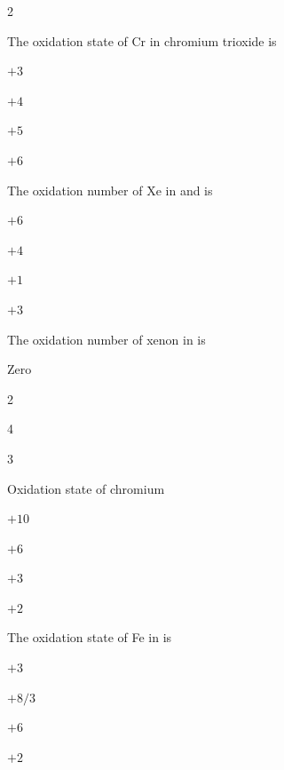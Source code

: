 \documentclass[10pt,a4paper]{article}
\begin{document}
\begin{multicols}{2}
\begin{questions}[start=56]
\item The oxidation state of Cr in chromium trioxide is
\begin{options}
  \item $+3$
  \item $+4$
  \item $+5$
  \item $+6$
\end{options}

\item The oxidation number of Xe in  and  is
\begin{options}
  \item $+6$
  \item $+4$
  \item $+1$
  \item $+3$
\end{options}

\item The oxidation number of xenon in  is
\begin{options}
  \item Zero
  \item 2
  \item 4
  \item 3
\end{options}

\item Oxidation state of chromium

\vspace{2pt}
\begin{center}
\end{center}
\begin{options}
  \item $+10$
  \item $+6$
  \item $+3$
  \item $+2$
\end{options}

\item The oxidation state of Fe in  is
\begin{options}
  \item $+3$
  \item $+8/3$
  \item $+6$
  \item $+2$
\end{options}


\end{questions}
\end{multicols}
\end{document}
